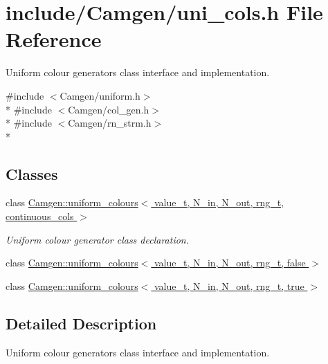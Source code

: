 \hypertarget{a00818}{}\section{include/\+Camgen/uni\+\_\+cols.h File Reference}
\label{a00818}


Uniform colour generators class interface and implementation.  


{\ttfamily \#include $<$Camgen/uniform.\+h$>$}\\*
{\ttfamily \#include $<$Camgen/col\+\_\+gen.\+h$>$}\\*
{\ttfamily \#include $<$Camgen/rn\+\_\+strm.\+h$>$}\\*
\subsection*{Classes}
\begin{DoxyCompactItemize}
\item 
class \hyperlink{a00557}{Camgen\+::uniform\+\_\+colours$<$ value\+\_\+t, N\+\_\+in, N\+\_\+out, rng\+\_\+t, continuous\+\_\+cols $>$}
\begin{DoxyCompactList}\small\item\em Uniform colour generator class declaration. \end{DoxyCompactList}\item 
class \hyperlink{a00558}{Camgen\+::uniform\+\_\+colours$<$ value\+\_\+t, N\+\_\+in, N\+\_\+out, rng\+\_\+t, false $>$}
\item 
class \hyperlink{a00559}{Camgen\+::uniform\+\_\+colours$<$ value\+\_\+t, N\+\_\+in, N\+\_\+out, rng\+\_\+t, true $>$}
\end{DoxyCompactItemize}


\subsection{Detailed Description}
Uniform colour generators class interface and implementation. 


